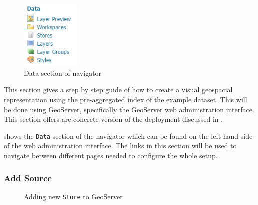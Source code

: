 \begin{figure}
	\centering
	  \vspace{-15pt}
	\includegraphics[width=0.25\textwidth]{Figures/Data.png}
	  \vspace{-10pt}
	\caption{\label{fig:data}Data section of navigator}
	  \vspace{-10pt}
\end{figure}
This section gives a step by step guide of how to create a visual
geospacial representation using the pre-aggregated index of the example
dataset. This will be done using GeoServer, specifically the GeoServer web
administration interface. This section offers are concrete version of the
deployment discussed in .

 shows the \lstinline|Data| section of the navigator which
can be found on the left hand side of the web administration interface. The
links in this section will be used to navigate between different pages
needed to configure the whole setup.

\subsubsection{Add Source}

\begin{figure}[t]
	\centering
	\caption{Adding new \lstinline|Store| to GeoServer}
\end{figure}

